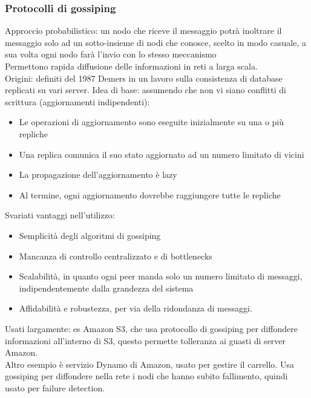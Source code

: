\documentclass{article}
\begin{document}
\subsubsection{Protocolli di gossiping}
Approccio probabilistico: un nodo che riceve il messaggio potrà inoltrare il messaggio solo ad un sotto-insieme di nodi che conosce, scelto in modo casuale, a sua volta ogni nodo farà l'invio con lo stesso meccanismo\\ Permettono rapida diffusione delle informazioni in reti a larga scala.\\ Origini: definiti del 1987 Demers in un lavoro sulla consistenza di database replicati su vari server. Idea di base: assumendo che non vi siano conflitti di scrittura (aggiornamenti indipendenti):
\begin{itemize}
\item Le operazioni di aggiornamento sono eseguite inizialmente su una o più repliche
\item Una replica comunica il suo stato aggiornato ad un numero limitato di vicini
\item La propagazione dell'aggiornamento è lazy
\item Al termine, ogni aggiornamento dovrebbe raggiungere tutte le repliche
\end{itemize}
Svariati vantaggi nell'utilizzo:
\begin{itemize}
\item Semplicità degli algoritmi di gossiping
\item Mancanza di controllo centralizzato e di bottlenecks
\item Scalabilità, in quanto ogni peer manda solo un numero limitato di messaggi, indipendentemente dalla grandezza del sistema
\item Affidabilità e robustezza, per via della ridondanza di messaggi.
\end{itemize}
Usati largamente: es Amazon S3, che usa protocollo di gossiping per diffondere informazioni all'interno di S3, questo permette tolleranza ai guasti di server Amazon.\\ Altro esempio è servizio Dynamo di Amazon, usato per gestire il carrello. Usa gossiping per diffondere nella rete i nodi che hanno subito fallimento, quindi usato per failure detection.
\end{document}
